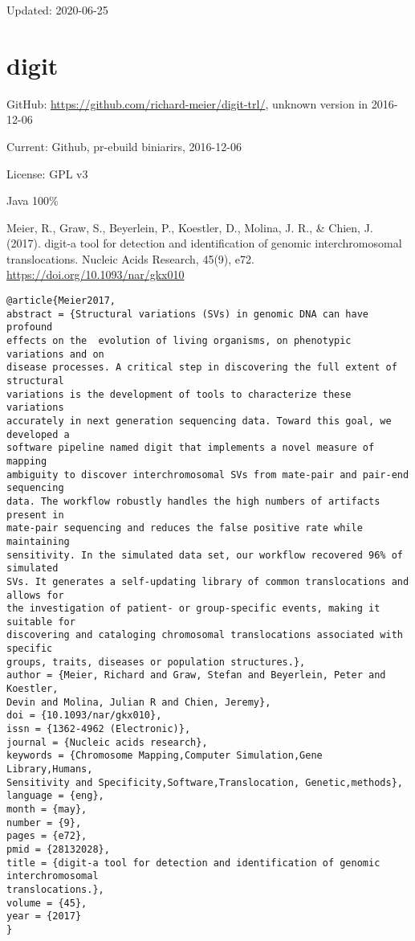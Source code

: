 \documentclass[]{article}
\begin{document}
Updated: 2020-06-25

\section{digit}

GitHub: \url{https://github.com/richard-meier/digit-trl/}, unknown version in 2016-12-06

Current: Github, pr-ebuild biniarirs, 2016-12-06

License: GPL v3

Java 100\%

Meier, R., Graw, S., Beyerlein, P., Koestler, D., Molina, J. R., \& Chien, J. (2017). digit-a tool for detection and identification of genomic interchromosomal  translocations. Nucleic Acids Research, 45(9), e72. \url{https://doi.org/10.1093/nar/gkx010}

\begin{verbatim}
@article{Meier2017,
abstract = {Structural variations (SVs) in genomic DNA can have profound
effects on the  evolution of living organisms, on phenotypic variations and on
disease processes. A critical step in discovering the full extent of structural
variations is the development of tools to characterize these variations
accurately in next generation sequencing data. Toward this goal, we developed a
software pipeline named digit that implements a novel measure of mapping
ambiguity to discover interchromosomal SVs from mate-pair and pair-end sequencing
data. The workflow robustly handles the high numbers of artifacts present in
mate-pair sequencing and reduces the false positive rate while maintaining
sensitivity. In the simulated data set, our workflow recovered 96% of simulated
SVs. It generates a self-updating library of common translocations and allows for
the investigation of patient- or group-specific events, making it suitable for
discovering and cataloging chromosomal translocations associated with specific
groups, traits, diseases or population structures.},
author = {Meier, Richard and Graw, Stefan and Beyerlein, Peter and Koestler,
Devin and Molina, Julian R and Chien, Jeremy},
doi = {10.1093/nar/gkx010},
issn = {1362-4962 (Electronic)},
journal = {Nucleic acids research},
keywords = {Chromosome Mapping,Computer Simulation,Gene Library,Humans,
Sensitivity and Specificity,Software,Translocation, Genetic,methods},
language = {eng},
month = {may},
number = {9},
pages = {e72},
pmid = {28132028},
title = {digit-a tool for detection and identification of genomic interchromosomal
translocations.},
volume = {45},
year = {2017}
}
\end{verbatim}
\end{document}

